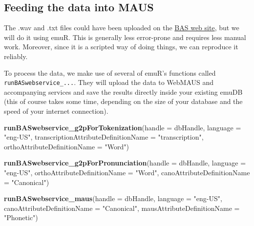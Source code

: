 \documentclass[]{book}
\newenvironment{Shaded}{\begin{snugshade}}{\end{snugshade}}
\newcommand{\KeywordTok}[1]{\textcolor[rgb]{0.13,0.29,0.53}{\textbf{{#1}}}}
\newcommand{\DataTypeTok}[1]{\textcolor[rgb]{0.13,0.29,0.53}{{#1}}}
\newcommand{\StringTok}[1]{\textcolor[rgb]{0.31,0.60,0.02}{{#1}}}
\newcommand{\NormalTok}[1]{{#1}}
\theoremstyle{definition}
\theoremstyle{definition}
\theoremstyle{definition}
\theoremstyle{remark}
\begin{document}
\subsection{Feeding the data into
MAUS}\label{feeding-the-data-into-maus}

The .wav and .txt files could have been uploaded on the
\href{https://clarin.phonetik.uni-muenchen.de/BASWebServices/\#!/services/Pipeline}{BAS
web site}, but we will do it using emuR. This is generally less
error-prone and requires less manual work. Moreover, since it is a
scripted way of doing things, we can reproduce it reliably.

To process the data, we make use of several of emuR's functions called
\texttt{runBASwebservice\_...}. They will upload the data to WebMAUS and
accompanying services and save the results directly inside your existing
emuDB (this of course takes some time, depending on the size of your
database and the speed of your internet connection).

\begin{Shaded}
\begin{Highlighting}[]
\KeywordTok{runBASwebservice_g2pForTokenization}\NormalTok{(}\DataTypeTok{handle =} \NormalTok{dbHandle,}
                                    \DataTypeTok{language =} \StringTok{"eng-US"}\NormalTok{,}
                                    \DataTypeTok{transcriptionAttributeDefinitionName =} \StringTok{"transcription"}\NormalTok{,}
                                    \DataTypeTok{orthoAttributeDefinitionName =} \StringTok{"Word"}\NormalTok{)}

\KeywordTok{runBASwebservice_g2pForPronunciation}\NormalTok{(}\DataTypeTok{handle =} \NormalTok{dbHandle,}
                                     \DataTypeTok{language =} \StringTok{"eng-US"}\NormalTok{,}
                                     \DataTypeTok{orthoAttributeDefinitionName =} \StringTok{"Word"}\NormalTok{,}
                                     \DataTypeTok{canoAttributeDefinitionName =} \StringTok{"Canonical"}\NormalTok{)}

\KeywordTok{runBASwebservice_maus}\NormalTok{(}\DataTypeTok{handle =} \NormalTok{dbHandle,}
                      \DataTypeTok{language =} \StringTok{"eng-US"}\NormalTok{,}
                      \DataTypeTok{canoAttributeDefinitionName =} \StringTok{"Canonical"}\NormalTok{,}
                      \DataTypeTok{mausAttributeDefinitionName =} \StringTok{"Phonetic"}\NormalTok{)}
\end{Highlighting}
\end{Shaded}
\end{document}

